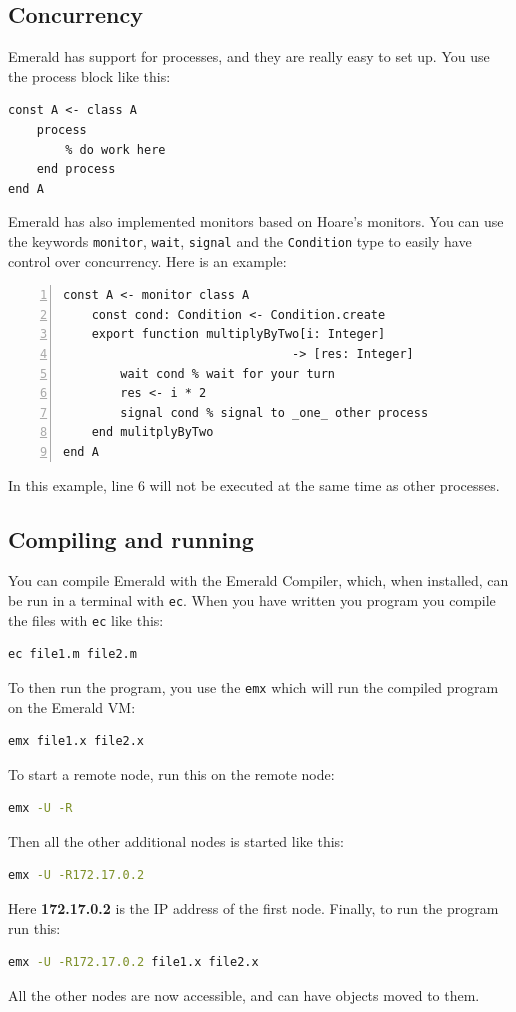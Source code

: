 \subsection{Concurrency}
Emerald has support for processes, and they are really easy to set up. You use the process block like this:
\begin{lstlisting}[language=emerald]
const A <- class A
    process
        % do work here
    end process
end A
\end{lstlisting}

Emerald has also implemented monitors based on Hoare's monitors\cite{hoare_monitors_1974}. You can use the keywords \verb|monitor|, \verb|wait|, \verb|signal| and the \verb|Condition| type to easily have control over concurrency. Here is an example:
\begin{lstlisting}[language=emerald, numbers=left]
const A <- monitor class A
    const cond: Condition <- Condition.create
    export function multiplyByTwo[i: Integer] 
                                -> [res: Integer]
        wait cond % wait for your turn
        res <- i * 2
        signal cond % signal to _one_ other process
    end mulitplyByTwo
end A
\end{lstlisting}
In this example, line 6 will not be executed at the same time as other processes.







\subsection{Compiling and running}
You can compile Emerald with the Emerald Compiler\cite{noauthor_emeraldold-emerald_2019}, which, when installed, can be run in a terminal with \verb|ec|. When you have written you program you compile the files with \verb|ec| like this:
\begin{lstlisting}[language=Bash]
ec file1.m file2.m 
\end{lstlisting}
To then run the program, you use the \verb|emx| which will run the compiled program on the Emerald VM:
\begin{lstlisting}[language=Bash]
emx file1.x file2.x
\end{lstlisting}

To start a remote node, run this on the remote node:
\begin{lstlisting}[language=Bash]
emx -U -R
\end{lstlisting}
Then all the other additional nodes is started like this:
\begin{lstlisting}[language=Bash]
emx -U -R172.17.0.2
\end{lstlisting}
Here \textbf{172.17.0.2} is the IP address of the first node.
Finally, to run the program run this:
\begin{lstlisting}[language=Bash]
emx -U -R172.17.0.2 file1.x file2.x
\end{lstlisting}
All the other nodes are now accessible, and can have objects moved to them.




